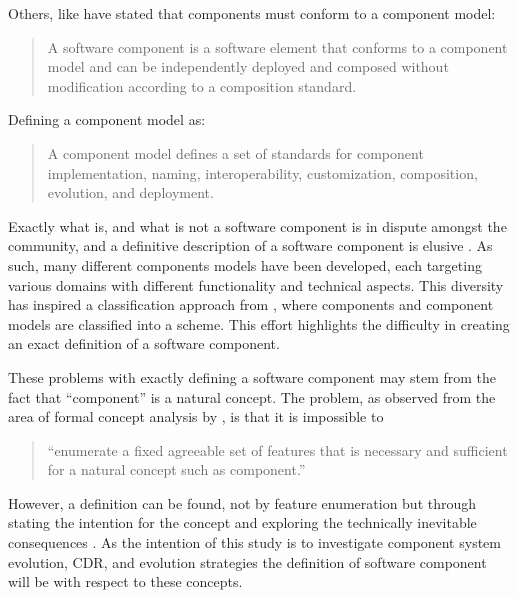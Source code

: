 Others, like \citep{heineman2001component} have stated that components must conform to a component model: 
\begin{quotation}
A software component is a software element that conforms to a component model and can be independently deployed and composed without modification according to a composition standard.
\end{quotation}

Defining a component model as:
\begin{quotation}
A component model defines a set of standards for component implementation, naming, interoperability, customization, composition, evolution, and deployment.
\end{quotation}

Exactly what is, and what is not a software component is in dispute amongst the community,
and a definitive description of a software component is elusive \citep{vasa2007patterns}.
As such, many different components models have been developed, each targeting various domains with different functionality and technical aspects.
This diversity has inspired a classification approach from \citep{Crnkovic2011}, where components and component models are classified into a scheme.
This effort highlights the difficulty in creating an exact definition of a software component. 

These problems with exactly defining a software component may stem from the fact that ``component'' is a natural concept.
The problem, as observed from the area of formal concept analysis \citep{Ganter1999} by \citep{Szyperski2002}, is that it is impossible to

\begin{quotation} 
``enumerate a fixed agreeable set of features that is necessary and sufficient for a natural concept such as component.'' 
\end{quotation}

However, a definition can be found, not by feature enumeration but through stating the intention for the concept and exploring the technically inevitable consequences \citep{Szyperski2002}. 
As the intention of this study is to investigate component system evolution, CDR, and evolution strategies
the definition of software component will be with respect to these concepts.

